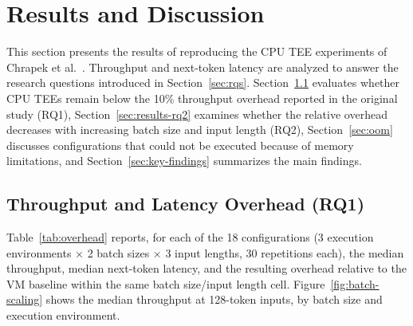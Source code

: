 \documentclass[sigconf]{acmart}
\begin{document}
\section{Results and Discussion}
\label{sec:results}

This section presents the results of reproducing the CPU TEE experiments of
Chrapek et al.~\cite{chrapek2025confidential}. Throughput and next-token latency are
analyzed to answer the research questions introduced in Section~\ref{sec:rqs}.
Section~\ref{sec:results-rq1} evaluates whether CPU TEEs remain below the 10\%
throughput overhead reported in the original study (RQ1),
Section~\ref{sec:results-rq2} examines whether the relative overhead decreases with
increasing batch size and input length (RQ2), Section~\ref{sec:oom} discusses
configurations that could not be executed because of memory limitations, and
Section~\ref{sec:key-findings} summarizes the main findings.

\subsection{Throughput and Latency Overhead (RQ1)}
\label{sec:results-rq1}

Table~\ref{tab:overhead} reports, for each of the 18 configurations (3 execution
environments $\times$ 2 batch sizes $\times$ 3 input lengths, 30 repetitions each), the
median throughput, median next-token latency, and the resulting overhead relative to
the VM baseline within the same batch size/input length cell.
Figure~\ref{fig:batch-scaling} shows the median throughput at 128-token inputs, by
batch size and execution environment.
\end{document}
